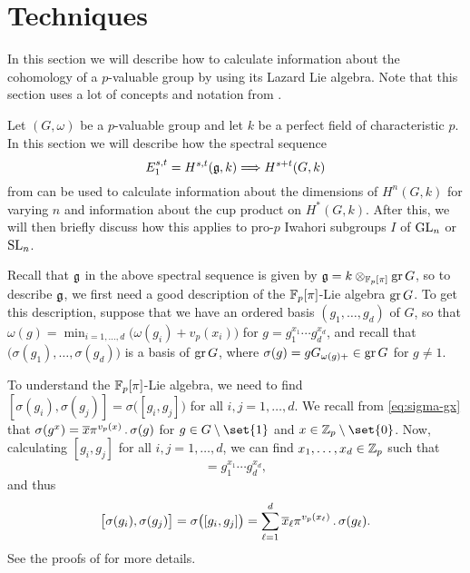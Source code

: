 \section{Techniques}%
\label{sec:tech-iwa}

In this section we will describe how to calculate information about the cohomology of a $p$-valuable group by using its Lazard Lie algebra. Note that this section uses a lot of concepts and notation from .

Let $(G, \omega)$ be a $p$-valuable group and let $k$ be a perfect field of characteristic $p$. In this section we will describe how the spectral sequence
\begin{equation}\label{eq:spec-sec-tech}
  E_{1}^{s,t} = H^{s,t}(\mathfrak{g}, k) \Longrightarrow H^{s+t}(G, k)
\end{equation}
from \cite[§6.1]{Sor} can be used to calculate information about the dimensions of $H^{n}(G,k)$ for varying $n$ and information about the cup product on $H^{*}(G,k)$. After this, we will then briefly discuss how this applies to pro-$p$ Iwahori subgroups $I$ of $\operatorname{GL}_{n}$ or $\operatorname{SL}_{n}$.

Recall that $\mathfrak{g}$ in the above spectral sequence is given by $\mathfrak{g} = k \otimes_{\mathbb{F}_{p}[\pi]} \operatorname{gr} G$, so to describe $\mathfrak{g}$, we first need a good description of the $\mathbb{F}_{p}[\pi]$-Lie algebra $\operatorname{gr} G$. To get this description, suppose that we have an ordered basis $(g_{1},\dotsc,g_{d})$ of $G$, so that $\omega(g) = \min_{i = 1,\dotsc,d} \bigl( \omega(g_{i}) + v_{p}(x_{i}) \bigr)$ for $g = g_{1}^{x_{1}} \dotsb g_{d}^{x_{d}}$, and recall that $\bigl( \sigma(g_{1}),\dotsc,\sigma(g_{d}) \bigr)$ is a basis of $\operatorname{gr} G$, where $\sigma(g) = gG_{\omega(g)+} \in \operatorname{gr} G$ for $g \neq 1$.

To understand the $\mathbb{F}_{p}[\pi]$-Lie algebra, we need to find $[\sigma(g_{i}),\sigma(g_{j})] = \sigma\bigl( [g_{i},g_{j}] \bigr)$ for all $i,j = 1,\dotsc,d$. We recall from \eqref{eq:sigma-gx} that $\sigma(g^{x}) = \overline{x}\pi^{v_{p}(x)} \,.\, \sigma(g)$ for $g \in G \setminus\set{1}$ and $x \in \Z_{p}\setminus\set{0}$. Now, calculating $[g_{i},g_{j}]$ for all $i,j = 1,\dotsc,d$, we can find $x_{1},\dotsc,x_{d} \in \mathbb{Z}_{p}$ such that
\begin{equation*}
  [g_{i},g_{j}] = g_{1}^{x_{1}} \dotsb g_{d}^{x_{d}},
\end{equation*}
and thus
\begin{equation*}
  \bigl[ \sigma(g_{i}),\sigma(g_{j}) \bigr] = \sigma\bigl( [g_{i},g_{j}] \bigr) = \sum_{\ell=1}^{d} \overline{x}_{\ell}\pi^{v_{p}(x_{\ell})} \,.\, \sigma(g_{\ell}).
\end{equation*}
See the proofs of \cite[Lem.~26.4 and Prop.~26.5]{Sch} for more details.

